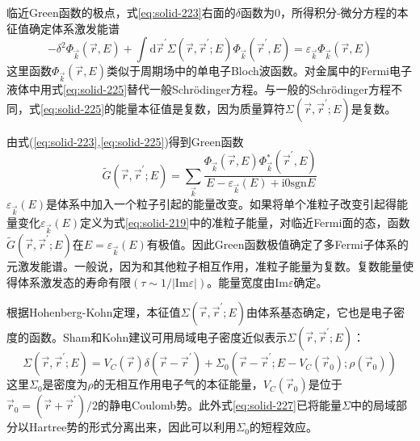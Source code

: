临近Green函数的极点，式\eqref{eq:solid-223}右面的$\delta$函数为0，所得积分-微分方程的本征值确定体系激发能谱\cite{Lifshitz,PR145-561_1966}
\begin{equation}
	-\delta^2\Phi_{\vec k}(\vec r,E)+\int\mathrm{d}\vec r^{\prime}\Sigma(\vec r,\vec r^{\prime};E)\Phi_{\vec k}(\vec r^{\prime},E)=\varepsilon_{\vec k}\Phi_{\vec k}(\vec r,E) 
  \label{eq:solid-225}
\end{equation}
这里函数$\Phi_{\vec k}(\vec r,E)$类似于周期场中的单电子Bloch波函数。对金属中的Fermi电子液体中用式\eqref{eq:solid-225}替代一般Schr\"odinger方程。与一般的Schr\"odinger方程不同，式\eqref{eq:solid-225}的能量本征值是复数，因为质量算符$\Sigma(\vec r,\vec r^{\prime};E)$是复数。

由式(\ref{eq:solid-223},\ref{eq:solid-225})得到Green函数
\begin{equation}
	\tilde G(\vec r,\vec r^{\prime};E)=\sum_{\vec k}\frac{\Phi_{\vec k}(\vec r,E)\Phi_{\vec k}^{\ast}(\vec r^{\prime},E)}{E-\varepsilon_{\vec k}(E)+\mathrm{i}0\mathrm{sgn}E}
  \label{eq:solid-226}
\end{equation}
$\varepsilon_{\vec k}(E)$是体系中加入一个粒子引起的能量改变。如果将单个准粒子改变引起得能量变化$\varepsilon_{\vec k}(E)$定义为式\eqref{eq:solid-219}中的准粒子能量，对临近Fermi面的态，函数$\tilde G(\vec r,\vec r^{\prime};E)$在$E=\varepsilon_{\vec k}(E)$有极值。因此Green函数极值确定了多Fermi子体系的元激发能谱。一般说，因为和其他粒子相互作用，准粒子能量为复数。复数能量使得体系激发态的寿命有限$(\tau\sim1/|\mathrm{Im}\varepsilon|)$\cite{Landau-Lifshitz}。能量宽度由$\mathrm{Im}\varepsilon$确定。


根据Hohenberg-Kohn定理，本征值$\Sigma(\vec r,\vec r^{\prime};E)$由体系基态确定，它也是电子密度的函数。Sham和Kohn建议可用局域电子密度近似表示$\Sigma(\vec r,\vec r^{\prime};E)$\cite{PR145-561_1966}：
\begin{equation}
  \Sigma(\vec r,\vec r^{\prime};E)=V_C(\vec r)\delta(\vec r-\vec r^{\prime})+\Sigma_0(\vec r-\vec r^{\prime};E-V_C(\vec r_0);\rho(\vec r_0))
  \label{eq:solid-227}
\end{equation}
这里$\Sigma_0$是密度为$\rho$的无相互作用电子气的本征能量，$V_C(\vec r_0)$是位于$\vec r_0=(\vec r+\vec r^{\prime})/2$的静电Coulomb势。此外式\eqref{eq:solid-227}已将能量$\Sigma$中的局域部分以Hartree势的形式分离出来，因此可以利用$\Sigma_0$的短程效应。

